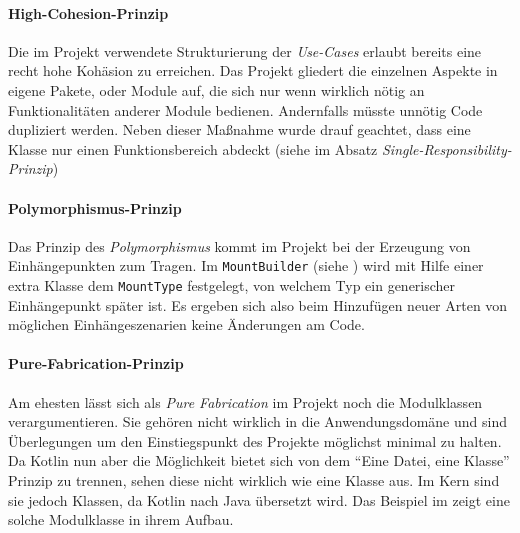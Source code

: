 \paragraph{High-Cohesion-Prinzip}

Die im Projekt verwendete Strukturierung der \emph{Use-Cases} erlaubt bereits eine recht hohe Kohäsion zu erreichen.
Das Projekt gliedert die einzelnen Aspekte in eigene Pakete, oder Module auf, die sich nur wenn wirklich nötig an Funktionalitäten anderer Module bedienen.
Andernfalls müsste unnötig Code dupliziert werden.
Neben dieser Maßnahme wurde drauf geachtet, dass eine Klasse nur einen Funktionsbereich abdeckt (siehe  im Absatz \emph{Single-Responsibility-Prinzip})

\paragraph{Polymorphismus-Prinzip}

Das Prinzip des \emph{Polymorphismus} kommt im Projekt bei der Erzeugung von Einhängepunkten zum Tragen.
Im \texttt{MountBuilder} (siehe ) wird mit Hilfe einer extra Klasse dem \texttt{MountType} festgelegt, von welchem Typ ein generischer Einhängepunkt später ist.
Es ergeben sich also beim Hinzufügen neuer Arten von möglichen Einhängeszenarien keine Änderungen am Code.

\bgroup

    \label{lst:mount_builder}
\egroup

\paragraph{Pure-Fabrication-Prinzip}

Am ehesten lässt sich als \emph{Pure Fabrication} im Projekt noch die Modulklassen verargumentieren.
Sie gehören nicht wirklich in die Anwendungsdomäne und sind Überlegungen um den Einstiegspunkt des Projekte möglichst minimal zu halten.
Da Kotlin nun aber die Möglichkeit bietet sich von dem \enquote{Eine Datei, eine Klasse} Prinzip zu trennen, sehen diese nicht wirklich wie eine Klasse aus.
Im Kern sind sie jedoch Klassen, da Kotlin nach Java übersetzt wird.
Das Beispiel im  zeigt eine solche Modulklasse in ihrem Aufbau.

\bgroup

